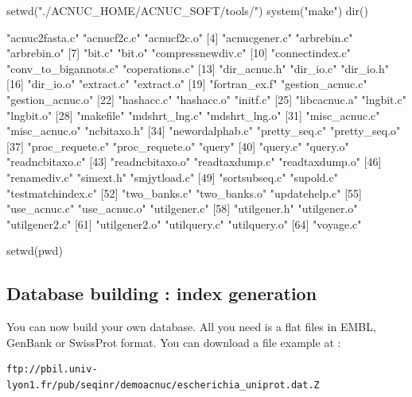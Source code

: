 \documentclass{article}
\begin{document}
\begin{itemize}
\begin{Schunk}
\begin{Sinput}
 setwd("./ACNUC_HOME/ACNUC_SOFT/tools/")
 system("make")
 dir()
\end{Sinput}
\begin{Soutput}
 [1] "acnuc2fasta.c"       "acnucf2c.c"          "acnucf2c.o"         
 [4] "acnucgener.c"        "arbrebin.c"          "arbrebin.o"         
 [7] "bit.c"               "bit.o"               "compressnewdiv.c"   
[10] "connectindex.c"      "conv_to_bigannots.c" "coperations.c"      
[13] "dir_acnuc.h"         "dir_io.c"            "dir_io.h"           
[16] "dir_io.o"            "extract.c"           "extract.o"          
[19] "fortran_ex.f"        "gestion_acnuc.c"     "gestion_acnuc.o"    
[22] "hashacc.c"           "hashacc.o"           "initf.c"            
[25] "libcacnuc.a"         "lngbit.c"            "lngbit.o"           
[28] "makefile"            "mdshrt_lng.c"        "mdshrt_lng.o"       
[31] "misc_acnuc.c"        "misc_acnuc.o"        "ncbitaxo.h"         
[34] "newordalphab.c"      "pretty_seq.c"        "pretty_seq.o"       
[37] "proc_requete.c"      "proc_requete.o"      "query"              
[40] "query.c"             "query.o"             "readncbitaxo.c"     
[43] "readncbitaxo.o"      "readtaxdump.c"       "readtaxdump.o"      
[46] "renamediv.c"         "simext.h"            "smjytload.c"        
[49] "sortsubseq.c"        "supold.c"            "testmatchindex.c"   
[52] "two_banks.c"         "two_banks.o"         "updatehelp.c"       
[55] "use_acnuc.c"         "use_acnuc.o"         "utilgener.c"        
[58] "utilgener.h"         "utilgener.o"         "utilgener2.c"       
[61] "utilgener2.o"        "utilquery.c"         "utilquery.o"        
[64] "voyage.c"           
\end{Soutput}
\begin{Sinput}
 setwd(pwd)
\end{Sinput}
\end{Schunk}

\end{itemize}
 
\subsection{Database building : index generation}


You can now build your own database.
All you need is a flat files
in EMBL, GenBank or SwissProt format. You can download a file example at :
\begin{verbatim}
ftp://pbil.univ-lyon1.fr/pub/seqinr/demoacnuc/escherichia_uniprot.dat.Z
\end{verbatim}
\end{document}
